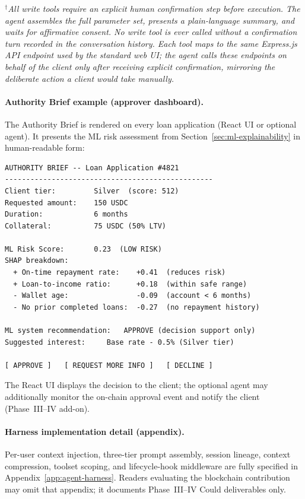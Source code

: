 \documentclass[12pt,a4paper]{report}
\begin{document}
\begin{table}[H]
\vspace{4pt}
\noindent\small$^{\dagger}$\textit{All write tools require an explicit human confirmation step before execution. The agent assembles the full parameter set, presents a plain-language summary, and waits for affirmative consent. No write tool is ever called without a confirmation turn recorded in the conversation history. Each tool maps to the same Express.js API endpoint used by the standard web UI; the agent calls these endpoints on behalf of the client only after receiving explicit confirmation, mirroring the deliberate action a client would take manually.}
\end{table}

\paragraph{Authority Brief example (approver dashboard).}

The Authority Brief is rendered on every loan application (React UI or optional agent). It presents the ML risk assessment from Section~\ref{sec:ml-explainability} in human-readable form:

\begin{verbatim}
AUTHORITY BRIEF -- Loan Application #4821
-------------------------------------------------
Client tier:         Silver  (score: 512)
Requested amount:    150 USDC
Duration:            6 months
Collateral:          75 USDC (50% LTV)

ML Risk Score:       0.23  (LOW RISK)
SHAP breakdown:
  + On-time repayment rate:    +0.41  (reduces risk)
  + Loan-to-income ratio:      +0.18  (within safe range)
  - Wallet age:                -0.09  (account < 6 months)
  - No prior completed loans:  -0.27  (no repayment history)

ML system recommendation:   APPROVE (decision support only)
Suggested interest:     Base rate - 0.5% (Silver tier)

[ APPROVE ]   [ REQUEST MORE INFO ]   [ DECLINE ]
\end{verbatim}

\noindent The React UI displays the decision to the client; the optional agent may additionally monitor the on-chain approval event and notify the client (Phase~III--IV add-on).

\paragraph{Harness implementation detail (appendix).}
Per-user context injection, three-tier prompt assembly, session lineage, context compression, toolset scoping, and lifecycle-hook middleware are fully specified in Appendix~\ref{app:agent-harness}. Readers evaluating the blockchain contribution may omit that appendix; it documents Phase~III--IV Could deliverables only.
\end{document}
